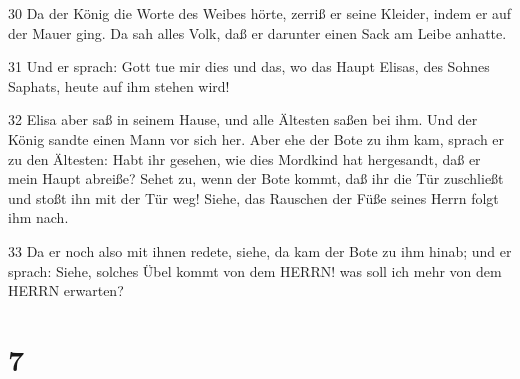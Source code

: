 \par 30 Da der König die Worte des Weibes hörte, zerriß er seine Kleider, indem er auf der Mauer ging. Da sah alles Volk, daß er darunter einen Sack am Leibe anhatte.
\par 31 Und er sprach: Gott tue mir dies und das, wo das Haupt Elisas, des Sohnes Saphats, heute auf ihm stehen wird!
\par 32 Elisa aber saß in seinem Hause, und alle Ältesten saßen bei ihm. Und der König sandte einen Mann vor sich her. Aber ehe der Bote zu ihm kam, sprach er zu den Ältesten: Habt ihr gesehen, wie dies Mordkind hat hergesandt, daß er mein Haupt abreiße? Sehet zu, wenn der Bote kommt, daß ihr die Tür zuschließt und stoßt ihn mit der Tür weg! Siehe, das Rauschen der Füße seines Herrn folgt ihm nach.
\par 33 Da er noch also mit ihnen redete, siehe, da kam der Bote zu ihm hinab; und er sprach: Siehe, solches Übel kommt von dem HERRN! was soll ich mehr von dem HERRN erwarten?

\chapter{7}

